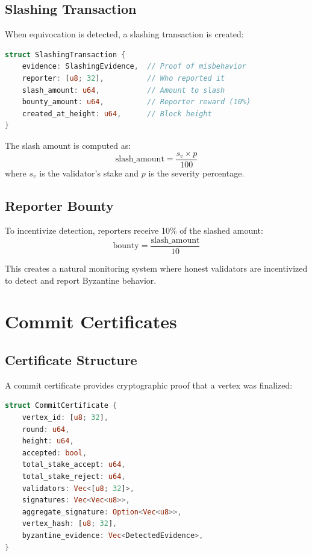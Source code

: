 \documentclass[11pt,a4paper]{article}
\begin{document}
\subsection{Slashing Transaction}

When equivocation is detected, a slashing transaction is created:

\begin{lstlisting}[language=Rust,caption={Slashing Transaction}]
struct SlashingTransaction {
    evidence: SlashingEvidence,  // Proof of misbehavior
    reporter: [u8; 32],          // Who reported it
    slash_amount: u64,           // Amount to slash
    bounty_amount: u64,          // Reporter reward (10%)
    created_at_height: u64,      // Block height
}
\end{lstlisting}

The slash amount is computed as:
$$\text{slash\_amount} = \frac{s_v \times p}{100}$$
where $s_v$ is the validator's stake and $p$ is the severity percentage.

\subsection{Reporter Bounty}

To incentivize detection, reporters receive 10\% of the slashed amount:
$$\text{bounty} = \frac{\text{slash\_amount}}{10}$$

This creates a natural monitoring system where honest validators are incentivized to detect and report Byzantine behavior.

\section{Commit Certificates}

\subsection{Certificate Structure}

A commit certificate provides cryptographic proof that a vertex was finalized:

\begin{lstlisting}[language=Rust,caption={Commit Certificate}]
struct CommitCertificate {
    vertex_id: [u8; 32],
    round: u64,
    height: u64,
    accepted: bool,
    total_stake_accept: u64,
    total_stake_reject: u64,
    validators: Vec<[u8; 32]>,
    signatures: Vec<Vec<u8>>,
    aggregate_signature: Option<Vec<u8>>,
    vertex_hash: [u8; 32],
    byzantine_evidence: Vec<DetectedEvidence>,
}
\end{lstlisting}
\end{document}
